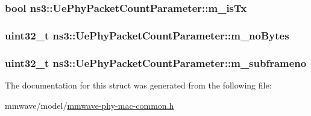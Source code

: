 \subsubsection[{\texorpdfstring{m\+\_\+is\+Tx}{m_isTx}}]{\setlength{\rightskip}{0pt plus 5cm}bool ns3\+::\+Ue\+Phy\+Packet\+Count\+Parameter\+::m\+\_\+is\+Tx}\hypertarget{structns3_1_1UePhyPacketCountParameter_a5edb3f8fb3d2115166609eecff05497f}{}\label{structns3_1_1UePhyPacketCountParameter_a5edb3f8fb3d2115166609eecff05497f}
\subsubsection[{\texorpdfstring{m\+\_\+no\+Bytes}{m_noBytes}}]{\setlength{\rightskip}{0pt plus 5cm}uint32\+\_\+t ns3\+::\+Ue\+Phy\+Packet\+Count\+Parameter\+::m\+\_\+no\+Bytes}\hypertarget{structns3_1_1UePhyPacketCountParameter_a71f38f5f000dab64cb0c8af6b14a9825}{}\label{structns3_1_1UePhyPacketCountParameter_a71f38f5f000dab64cb0c8af6b14a9825}
\subsubsection[{\texorpdfstring{m\+\_\+subframeno}{m_subframeno}}]{\setlength{\rightskip}{0pt plus 5cm}uint32\+\_\+t ns3\+::\+Ue\+Phy\+Packet\+Count\+Parameter\+::m\+\_\+subframeno}\hypertarget{structns3_1_1UePhyPacketCountParameter_a0a7375022f0103933fd38ccecb46bf3d}{}\label{structns3_1_1UePhyPacketCountParameter_a0a7375022f0103933fd38ccecb46bf3d}


The documentation for this struct was generated from the following file\+:\begin{DoxyCompactItemize}
\item 
mmwave/model/\hyperlink{mmwave-phy-mac-common_8h}{mmwave-\/phy-\/mac-\/common.\+h}\end{DoxyCompactItemize}
